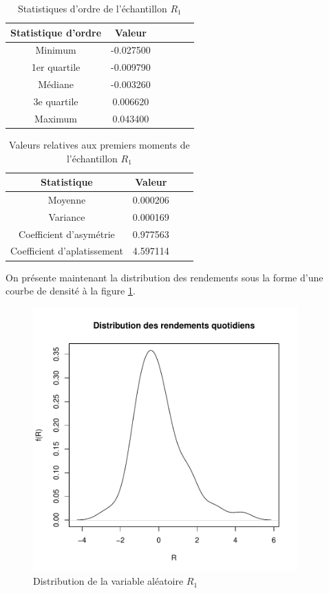 \begin{table}[!ht]
  \centering
  \begin{tabular}{cccccc}
    \hline
    \textbf{Statistique d'ordre} & \textbf{Valeur} \\
    \hline
    Minimum & -0.027500\\ 
    1er quartile & -0.009790\\ 
    Médiane & -0.003260\\ 
    3e quartile & 0.006620\\ 
    Maximum & 0.043400\\ 
    \hline
    
  \end{tabular}
  \caption{Statistiques d'ordre de l'échantillon $R_1$}
  \label{tab:statordreR1}
\end{table}

\begin{table}[!ht]
  \centering
  \begin{tabular}{cccc}
    \hline
    \textbf{Statistique} & \textbf{Valeur} \\
    \hline
    Moyenne & 0.000206\\ 
    Variance & 0.000169\\ 
    Coefficient d'asymétrie & 0.977563\\ 
    Coefficient d'aplatissement & 4.597114 \\ 
    \hline
  \end{tabular}
  \caption{Valeurs relatives aux premiers moments de l'échantillon $R_1$}
  \label{tab:statmomentsR1}
\end{table}

On présente maintenant la distribution des rendements sous la forme
d'une courbe de densité à la figure \ref{fig:distributionR1}.

\begin{figure}[!ht]
  \centering
  \includegraphics[height=4in,width=4in]{./graphiques/ABBEYN-histogramme.pdf}
  \caption{Distribution de la variable aléatoire $R_1$}
  \label{fig:distributionR1}
\end{figure}

